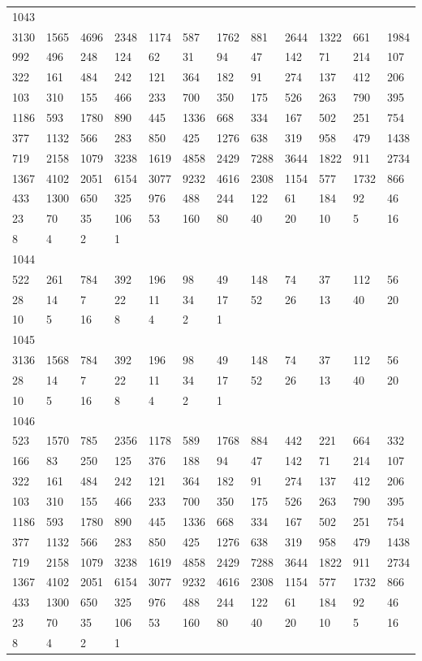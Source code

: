 \begin{longtable}{llllllllllll}
1043&&&&&&&&&&&\\
3130& 1565& 4696& 2348& 1174& 587& 1762& 881& 2644& 1322& 661& 1984\\
992& 496& 248& 124& 62& 31& 94& 47& 142& 71& 214& 107\\
322& 161& 484& 242& 121& 364& 182& 91& 274& 137& 412& 206\\
103& 310& 155& 466& 233& 700& 350& 175& 526& 263& 790& 395\\
1186& 593& 1780& 890& 445& 1336& 668& 334& 167& 502& 251& 754\\
377& 1132& 566& 283& 850& 425& 1276& 638& 319& 958& 479& 1438\\
719& 2158& 1079& 3238& 1619& 4858& 2429& 7288& 3644& 1822& 911& 2734\\
1367& 4102& 2051& 6154& 3077& 9232& 4616& 2308& 1154& 577& 1732& 866\\
433& 1300& 650& 325& 976& 488& 244& 122& 61& 184& 92& 46\\
23& 70& 35& 106& 53& 160& 80& 40& 20& 10& 5& 16\\
8& 4& 2& 1& \\

1044&&&&&&&&&&&\\
522& 261& 784& 392& 196& 98& 49& 148& 74& 37& 112& 56\\
28& 14& 7& 22& 11& 34& 17& 52& 26& 13& 40& 20\\
10& 5& 16& 8& 4& 2& 1& \\

1045&&&&&&&&&&&\\
3136& 1568& 784& 392& 196& 98& 49& 148& 74& 37& 112& 56\\
28& 14& 7& 22& 11& 34& 17& 52& 26& 13& 40& 20\\
10& 5& 16& 8& 4& 2& 1& \\

1046&&&&&&&&&&&\\
523& 1570& 785& 2356& 1178& 589& 1768& 884& 442& 221& 664& 332\\
166& 83& 250& 125& 376& 188& 94& 47& 142& 71& 214& 107\\
322& 161& 484& 242& 121& 364& 182& 91& 274& 137& 412& 206\\
103& 310& 155& 466& 233& 700& 350& 175& 526& 263& 790& 395\\
1186& 593& 1780& 890& 445& 1336& 668& 334& 167& 502& 251& 754\\
377& 1132& 566& 283& 850& 425& 1276& 638& 319& 958& 479& 1438\\
719& 2158& 1079& 3238& 1619& 4858& 2429& 7288& 3644& 1822& 911& 2734\\
1367& 4102& 2051& 6154& 3077& 9232& 4616& 2308& 1154& 577& 1732& 866\\
433& 1300& 650& 325& 976& 488& 244& 122& 61& 184& 92& 46\\
23& 70& 35& 106& 53& 160& 80& 40& 20& 10& 5& 16\\
8& 4& 2& 1& \\


\end{longtable}
